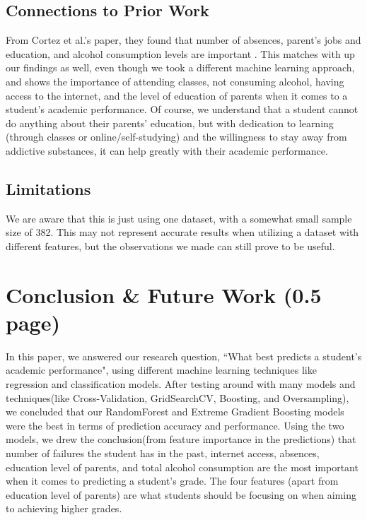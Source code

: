 \documentclass[11pt,a4paper]{article}
\begin{document}
\subsection{Connections to Prior Work}
From Cortez et al.'s paper, they found that number of absences, parent’s jobs and education, and alcohol consumption levels are important \cite{cortez2008using}. This matches with up our findings as well, even though we took a different machine learning approach, and shows the importance of attending classes, not consuming alcohol, having access to the internet, and the level of education of parents when it comes to a student's academic performance. Of course, we understand that a student cannot do anything about their parents' education, but with dedication to learning (through classes or online/self-studying) and the willingness to stay away from addictive substances, it can help greatly with their academic performance. 

\subsection{Limitations}
We are aware that this is just using one dataset, with a somewhat small sample size of 382. This may not represent accurate results when utilizing a dataset with different features, but the observations we made can still prove to be useful.

\section{Conclusion \& Future Work (0.5 page)}
In this paper, we answered our research question, ``What best predicts a student's academic performance", using different machine learning techniques like regression and classification models. After testing around with many models and techniques(like Cross-Validation, GridSearchCV, Boosting, and Oversampling), we concluded that our RandomForest and Extreme Gradient Boosting models were the best in terms of prediction accuracy and performance. Using the two models, we drew the conclusion(from feature importance in the predictions) that number of failures the student has in the past, internet access, absences, education level of parents, and total alcohol consumption are the most important when it comes to predicting a student's grade. The four features (apart from education level of parents) are what students should be focusing on when aiming to achieving higher grades.
\end{document}
